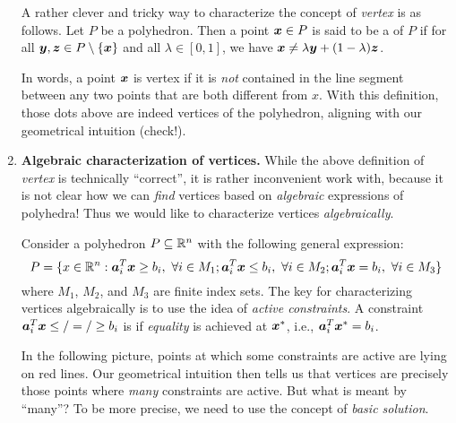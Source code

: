 \begin{enumerate}
A rather clever and tricky way to characterize the concept of \emph{vertex} is
as follows. Let \(P\) be a polyhedron. Then a point \(\bm{x}\in P\) is said
to be a  of \(P\) if for all \(\bm{y},\bm{z}\in P\setminus
\{\bm{x}\}\) and all \(\lambda\in[0,1]\), we have \(\bm{x}\ne
\lambda\bm{y}+(1-\lambda)\bm{z}\).

In words, a point \(\bm{x}\) is vertex if it is \emph{not} contained in the
line segment between any two points that are both different from \(x\).  With
this definition, those  dots above are indeed vertices of the
polyhedron, aligning with our geometrical intuition (check!).

\item \textbf{Algebraic characterization of vertices.} While the above
definition of \emph{vertex} is technically ``correct'', it is rather
inconvenient work with, because it is not clear how we can \emph{find} vertices
based on \emph{algebraic} expressions of polyhedra! Thus we would like to
characterize vertices \emph{algebraically}.

Consider a polyhedron \(P\subseteq \mathbb{R}^n\) with the following general expression:
\[
P=\{x\in\mathbb{R}^n:\bm{a}_i^{T}\bm{x}\ge b_i,~\forall i\in M_1;
\bm{a}_i^{T}\bm{x}\le b_i,~\forall i\in M_2;
\bm{a}_i^{T}\bm{x}=b_i,~\forall i\in M_3\}
\]
where \(M_1\), \(M_2\), and \(M_3\) are finite index sets. The key 
for characterizing vertices algebraically is to use the idea of \emph{active
constraints}. A constraint \(\bm{a}_i^{T}\bm{x}\le/=/\ge b_i\) is
 if \emph{equality} is achieved at
\(\bm{x}^*\), i.e., \(\bm{a}_i^{T}\bm{x}^*=b_i\).

In the following picture, points at which some constraints are active are lying
on red lines. Our geometrical intuition then tells us that vertices are
precisely those points where \emph{many} constraints are active. But what is
meant by ``many''? To be more precise, we need to use the concept of
\emph{basic solution}.
\begin{center}
\end{center}


\end{enumerate}
